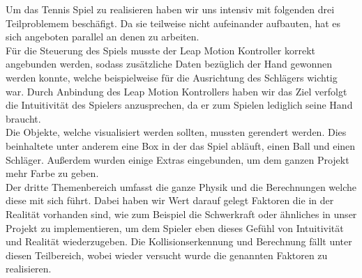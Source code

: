 Um das Tennis Spiel zu realisieren haben wir uns intensiv mit folgenden drei Teilproblemem beschäfigt. Da sie teilweise nicht aufeinander aufbauten, hat es sich angeboten parallel an denen zu arbeiten.\\
Für die Steuerung des Spiels musste der Leap Motion Kontroller korrekt angebunden werden, sodass zusätzliche Daten bezüglich der Hand gewonnen werden konnte, welche beispielweise für die Ausrichtung des Schlägers wichtig war.
Durch Anbindung des Leap Motion Kontrollers haben wir das Ziel verfolgt die Intuitivität des Spielers anzusprechen, da er zum Spielen lediglich seine Hand braucht.\\
Die Objekte, welche visualisiert werden sollten, mussten gerendert werden. Dies beinhaltete unter anderem eine Box in der das Spiel abläuft, einen Ball und einen Schläger. Außerdem wurden
einige Extras eingebunden, um dem ganzen Projekt mehr Farbe zu geben.\\
Der dritte Themenbereich umfasst die ganze Physik und die Berechnungen welche diese mit sich führt. Dabei haben wir Wert darauf gelegt Faktoren die in der Realität vorhanden sind, wie 
zum Beispiel die Schwerkraft oder ähnliches in unser Projekt zu implementieren, um dem Spieler eben dieses Gefühl von Intuitivität und Realität wiederzugeben. 
Die Kollisionserkennung und Berechnung fällt unter diesen Teilbereich, wobei wieder versucht wurde die genannten Faktoren zu realisieren.


